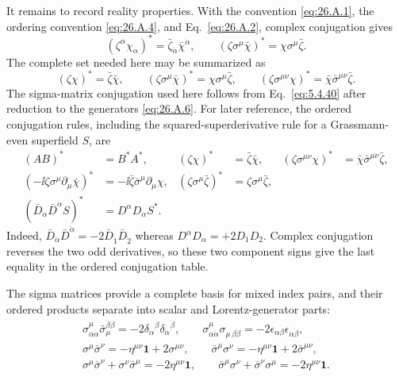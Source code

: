 It remains to record reality properties.  With the convention
\eqref{eq:26.A.1}, the ordering convention \eqref{eq:26.A.4}, and
Eq.~\eqref{eq:26.A.2}, complex conjugation gives
\[
  (\zeta^\alpha\chi_\alpha)^*
  =\bar\zeta_{\dot\alpha}\bar\chi^{\dot\alpha},
  \qquad
  (\zeta\sigma^\mu\bar\chi)^*
  =\chi\sigma^\mu\bar\zeta .
\]
The complete set needed here may be summarized as
\begin{equation}
  (\zeta\chi)^*=\bar\zeta\bar\chi,\qquad
  (\zeta\sigma^\mu\bar\chi)^*
    =\chi\sigma^\mu\bar\zeta,\qquad
  (\zeta\sigma^{\mu\nu}\chi)^*
    =\bar\chi\bar\sigma^{\mu\nu}\bar\zeta .
  \tag{26.A.20}\label{eq:26.A.20}
\end{equation}
The sigma-matrix conjugation used here follows from
Eq.~\eqref{eq:5.4.40} after reduction to the generators
\eqref{eq:26.A.6}.  For later reference, the ordered conjugation rules,
including the squared-superderivative rule for a Grassmann-even superfield
\(S\), are
\begin{equation}
  \begin{aligned}
  (AB)^*&=B^*A^*,
  &(\zeta\chi)^*&=\bar\zeta\bar\chi,
  &(\zeta\sigma^{\mu\nu}\chi)^*
    &=\bar\chi\bar\sigma^{\mu\nu}\bar\zeta,
  \\
  \left(-\ii\zeta\sigma^\mu\partial_\mu\bar\chi\right)^*
    &=-\ii\bar\zeta\bar\sigma^\mu\partial_\mu\chi,
  &(\zeta\sigma^\mu\bar\zeta)^*
    &=\zeta\sigma^\mu\bar\zeta,
  \\
  \left(\bar D_{\dot\alpha}\bar D^{\dot\alpha}S\right)^*
    &=D^\alpha D_\alpha S^* .
  \end{aligned}
  \tag{26.A.21}\label{eq:26.A.21}
\end{equation}
Indeed,
\(\bar D_{\dot\alpha}\bar D^{\dot\alpha}
=-2\bar D_{\dot1}\bar D_{\dot2}\) whereas
\(D^\alpha D_\alpha=+2D_1D_2\).  Complex conjugation reverses the two
odd derivatives, so these two component signs give the last equality in
the ordered conjugation table.

The sigma matrices provide a complete basis for mixed index pairs, and their
ordered products separate into scalar and Lorentz-generator parts:
\[
  \begin{gathered}
  \sigma^\mu_{\alpha\dot\alpha}
  \bar\sigma_{\mu}^{\dot\beta\beta}
  =-2\delta_\alpha{}^\beta
    \delta_{\dot\alpha}{}^{\dot\beta},
  \qquad
  \sigma^\mu_{\alpha\dot\alpha}
  \sigma_{\mu\,\beta\dot\beta}
  =-2\epsilon_{\alpha\beta}\epsilon_{\dot\alpha\dot\beta},
  \\
  \sigma^\mu\bar\sigma^\nu
  =-\eta^{\mu\nu}\mathbf{1}+2\sigma^{\mu\nu},
  \qquad
  \bar\sigma^\mu\sigma^\nu
  =-\eta^{\mu\nu}\mathbf{1}+2\bar\sigma^{\mu\nu},
  \\
  \sigma^\mu\bar\sigma^\nu+\sigma^\nu\bar\sigma^\mu
  =-2\eta^{\mu\nu}\mathbf{1},
  \qquad
  \bar\sigma^\mu\sigma^\nu+\bar\sigma^\nu\sigma^\mu
  =-2\eta^{\mu\nu}\mathbf{1} .
  \end{gathered}
\]


